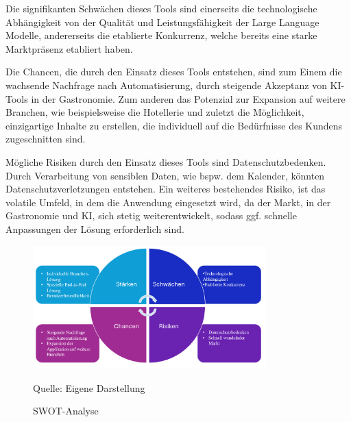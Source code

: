 Die signifikanten Schwächen dieses Tools sind einerseits die technologische Abhängigkeit von der Qualität und Leistungsfähigkeit der Large Language Modelle, andererseits die etablierte Konkurrenz, welche bereits eine starke Marktpräsenz etabliert haben.

Die Chancen, die durch den Einsatz dieses Tools entstehen, sind zum Einem die wachsende Nachfrage nach Automatisierung, durch steigende Akzeptanz von KI-Tools in der Gastronomie.
Zum anderen das Potenzial zur Expansion auf weitere Branchen, wie beispielsweise die Hotellerie und zuletzt die Möglichkeit, einzigartige Inhalte zu erstellen, die individuell auf die Bedürfnisse des Kundens zugeschnitten sind.

Mögliche Risiken durch den Einsatz dieses Tools sind Datenschutzbedenken.
Durch Verarbeitung von sensiblen Daten, wie bspw. dem Kalender, könnten Datenschutzverletzungen entstehen.
Ein weiteres bestehendes Risiko, ist das volatile Umfeld, in dem die Anwendung eingesetzt wird, da der Markt, in der Gastronomie und KI, sich stetig weiterentwickelt, sodass ggf. schnelle Anpassungen der Lösung erforderlich sind.

\begin{figure}[htbp]
    \centering
    \includegraphics[width=0.8\textwidth]{abbildungen/SWOT}
    \caption{SWOT-Analyse}
    \label{fig:SWOT-Analyse}
    \raggedright Quelle: Eigene Darstellung
\end{figure}


